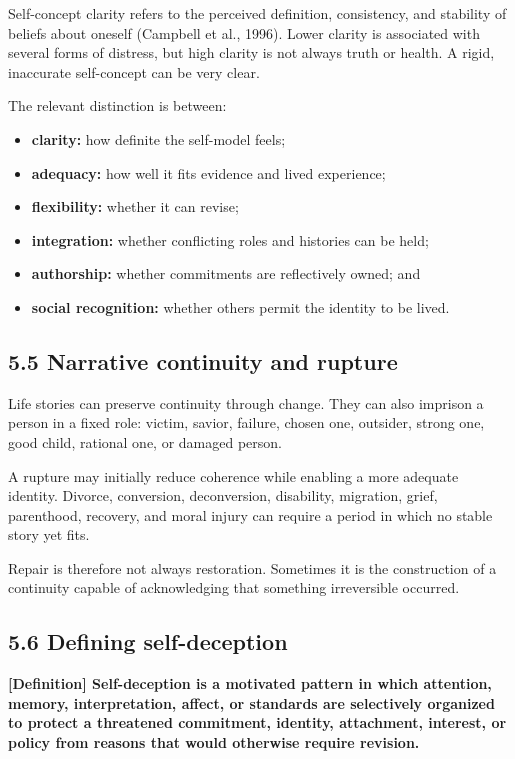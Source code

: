 \documentclass[
  11pt,
]{article}
\providecommand{\tightlist}{%
  \setlength{\itemsep}{0pt}\setlength{\parskip}{0pt}}
\begin{document}
Self-concept clarity refers to the perceived definition, consistency,
and stability of beliefs about oneself (Campbell et al., 1996). Lower
clarity is associated with several forms of distress, but high clarity
is not always truth or health. A rigid, inaccurate self-concept can be
very clear.

The relevant distinction is between:

\begin{itemize}
\tightlist
\item
  \textbf{clarity:} how definite the self-model feels;
\item
  \textbf{adequacy:} how well it fits evidence and lived experience;
\item
  \textbf{flexibility:} whether it can revise;
\item
  \textbf{integration:} whether conflicting roles and histories can be
  held;
\item
  \textbf{authorship:} whether commitments are reflectively owned; and
\item
  \textbf{social recognition:} whether others permit the identity to be
  lived.
\end{itemize}

\subsection{5.5 Narrative continuity and
rupture}\label{narrative-continuity-and-rupture}

Life stories can preserve continuity through change. They can also
imprison a person in a fixed role: victim, savior, failure, chosen one,
outsider, strong one, good child, rational one, or damaged person.

A rupture may initially reduce coherence while enabling a more adequate
identity. Divorce, conversion, deconversion, disability, migration,
grief, parenthood, recovery, and moral injury can require a period in
which no stable story yet fits.

Repair is therefore not always restoration. Sometimes it is the
construction of a continuity capable of acknowledging that something
irreversible occurred.

\subsection{5.6 Defining self-deception}\label{defining-self-deception}

\textbf{{[}Definition{]} Self-deception is a motivated pattern in which
attention, memory, interpretation, affect, or standards are selectively
organized to protect a threatened commitment, identity, attachment,
interest, or policy from reasons that would otherwise require revision.}
\end{document}
